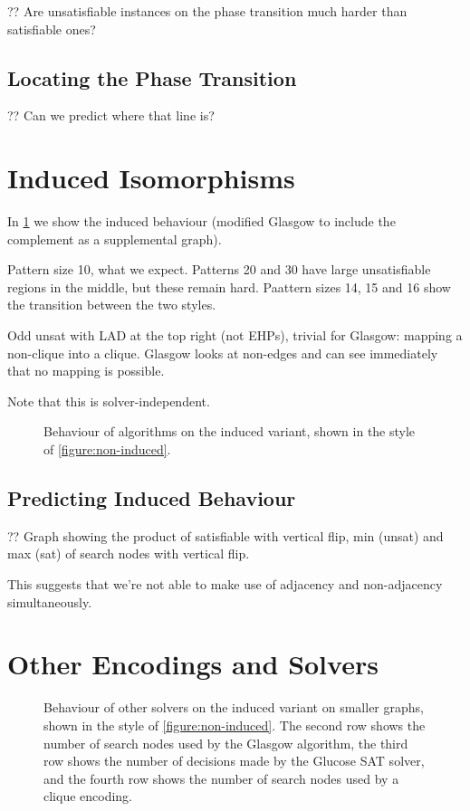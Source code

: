 \documentclass[letterpaper]{article}
\begin{document}
?? Are unsatisfiable instances on the phase transition much harder than satisfiable ones?

\subsection{Locating the Phase Transition}

?? Can we predict where that line is?

\section{Induced Isomorphisms}

In \cref{figure:induced} we show the induced behaviour (modified Glasgow to include the complement
as a supplemental graph).

Pattern size 10, what we expect. Patterns 20 and 30 have large unsatisfiable regions in the middle,
but these remain hard. Paattern sizes 14, 15 and 16 show the transition between the two styles.

Odd unsat with LAD at the top right (not EHPs), trivial for Glasgow: mapping a non-clique into a
clique. Glasgow looks at non-edges and can see immediately that no mapping is possible.

Note that this is solver-independent.

\begin{figure*}[tb]
    \hskip-1.2cm
    \setlength{\abovecaptionskip}{-3em}
    \caption{Behaviour of algorithms on the induced variant, shown in the style
    of \cref{figure:non-induced}.}\label{figure:induced}
\end{figure*}

\subsection{Predicting Induced Behaviour}

?? Graph showing the product of satisfiable with vertical flip, min (unsat) and max (sat) of search
nodes with vertical flip.

This suggests that we're not able to make use of adjacency and non-adjacency simultaneously.

\section{Other Encodings and Solvers}

\begin{figure*}[tb]
    \hskip-1.2cm
    \setlength{\abovecaptionskip}{-3em}
    \caption{Behaviour of other solvers on the induced variant on smaller graphs, shown in the style of
        \cref{figure:non-induced}. The second row shows the number of search nodes used by the Glasgow
        algorithm, the third row shows the number of decisions made by the Glucose SAT solver, and
    the fourth row shows the number of search nodes used by a clique encoding.}\label{figure:alt}
\end{figure*}
\end{document}
